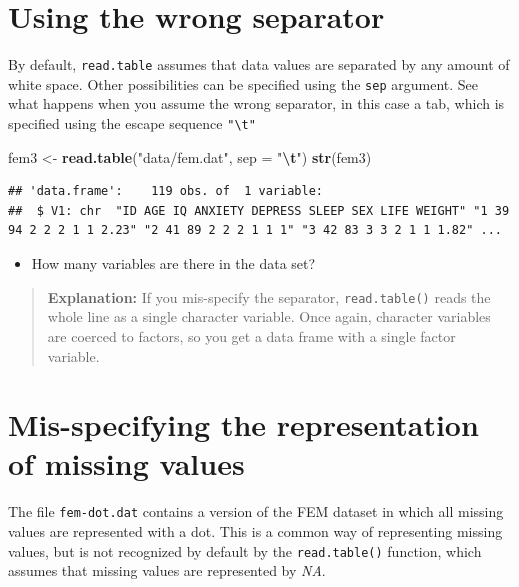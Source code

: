 \documentclass[
]{book}
\newenvironment{Shaded}{\begin{snugshade}}{\end{snugshade}}
\newcommand{\AttributeTok}[1]{\textcolor[rgb]{0.13,0.29,0.53}{#1}}
\newcommand{\FunctionTok}[1]{\textcolor[rgb]{0.13,0.29,0.53}{\textbf{#1}}}
\newcommand{\NormalTok}[1]{#1}
\newcommand{\OtherTok}[1]{\textcolor[rgb]{0.56,0.35,0.01}{#1}}
\newcommand{\SpecialCharTok}[1]{\textcolor[rgb]{0.81,0.36,0.00}{\textbf{#1}}}
\newcommand{\StringTok}[1]{\textcolor[rgb]{0.31,0.60,0.02}{#1}}
\providecommand{\tightlist}{%
  \setlength{\itemsep}{0pt}\setlength{\parskip}{0pt}}
\theoremstyle{definition}
\theoremstyle{definition}
\theoremstyle{definition}
\theoremstyle{definition}
\theoremstyle{remark}
\begin{document}
\section{Using the wrong separator}\label{using-the-wrong-separator}

By default, \texttt{read.table} assumes that data values are separated
by any amount of white space. Other possibilities can be specified
using the \texttt{sep} argument. See what happens when you assume the
wrong separator, in this case a tab, which is specified using the
escape sequence \texttt{"\textbackslash{}t"}

\begin{Shaded}
\begin{Highlighting}[]
\NormalTok{fem3 }\OtherTok{\textless{}{-}} \FunctionTok{read.table}\NormalTok{(}\StringTok{"data/fem.dat"}\NormalTok{, }\AttributeTok{sep =} \StringTok{"}\SpecialCharTok{\textbackslash{}t}\StringTok{"}\NormalTok{)}
\FunctionTok{str}\NormalTok{(fem3)}
\end{Highlighting}
\end{Shaded}

\begin{verbatim}
## 'data.frame':    119 obs. of  1 variable:
##  $ V1: chr  "ID AGE IQ ANXIETY DEPRESS SLEEP SEX LIFE WEIGHT" "1 39 94 2 2 2 1 1 2.23" "2 41 89 2 2 2 1 1 1" "3 42 83 3 3 2 1 1 1.82" ...
\end{verbatim}

\begin{itemize}
\tightlist
\item
  How many variables are there in the data set?
\end{itemize}

\begin{quote}
\textbf{Explanation:} If you mis-specify the separator,
\texttt{read.table()} reads the whole line as a single character
variable. Once again, character variables are coerced to factors, so
you get a data frame with a single factor variable.
\end{quote}

\section{Mis-specifying the representation of missing values}\label{mis-specifying-the-representation-of-missing-values}

The file \texttt{fem-dot.dat} contains a version of the FEM dataset in
which all missing values are represented with a dot. This is a common
way of representing missing values, but is not recognized by default
by the \texttt{read.table()} function, which assumes that missing values
are represented by \emph{NA}.
\end{document}
